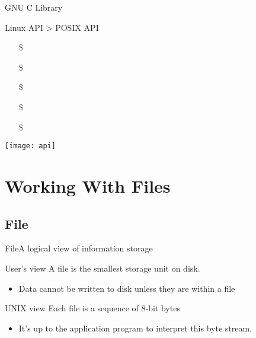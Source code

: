 \begin{frame}{GNU C Library}
  \begin{minipage}{.55\linewidth}
    Linux API > POSIX API
    \begin{itemize}
    \item[\$] 
    \item[\$] 
    \item[\$] \cmd{}
    \item[\$] \cmd{}
    \item[\$] \cmd{}
    \end{itemize}
  \end{minipage}
  \begin{minipage}{.4\linewidth}
    \texttt{[image: api]}
  \end{minipage}
\end{frame}


\section{Working With Files}
\label{sec:working-with-files}

\subsection{File}
\label{sec:file}

\begin{frame}{File}{A logical view of information storage}
  \begin{block}{User's view}
    A file is the smallest storage unit on disk.
    \begin{itemize}
    \item Data cannot be written to disk unless they are within a file
    \end{itemize}
  \end{block}
  \begin{block}{UNIX view}
    Each file is a sequence of 8-bit bytes
    \begin{itemize}
    \item It's up to the application program to interpret this byte stream.
    \end{itemize}
  \end{block}
\end{frame}

